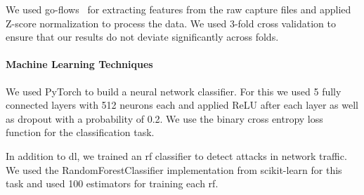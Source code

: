 \documentclass[10pt,sigconf,letterpaper,dvipsnames]{acmart}
\begin{document}
We used go-flows~\cite{vormayr_cn-tu/go-flows_2019}
for extracting features from the raw capture files and applied Z-score normalization to process the data. We used 3-fold cross validation to ensure that our results do not deviate significantly across folds.


\paragraph{Machine Learning Techniques}
We used PyTorch to build a neural network classifier. For this we used 5 fully connected layers with 512 neurons each and applied ReLU after each layer as well as dropout with a probability of 0.2. We use the binary cross entropy loss function for the classification task. %

In addition to \gls{dl}, we trained an \gls{rf} classifier to detect attacks in network traffic. We used the RandomForestClassifier implementation from scikit-learn for this task and used 100 estimators for training each \gls{rf}.
\end{document}
